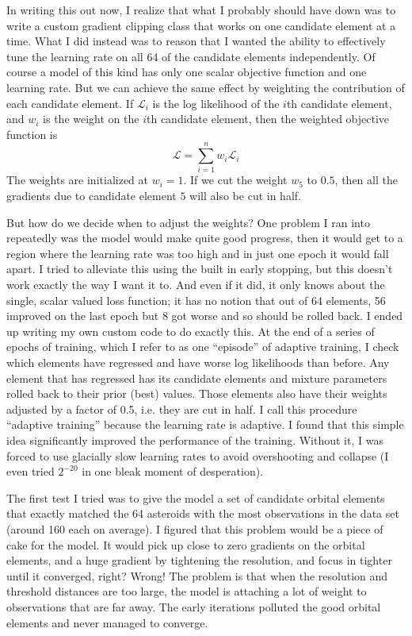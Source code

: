 In writing this out now, I realize that what I probably should have down was to write a custom gradient clipping class that works on one candidate element at a time.
What I did instead was to reason that I wanted the ability to effectively tune the learning rate on all 64 of the candidate elements independently.
Of course a model of this kind has only one scalar objective function and one learning rate.
But we can achieve the same effect by weighting the contribution of each candidate element.
If $\mathcal{L}_i$ is the log likelihood of the $i$th candidate element, and $w_i$ is the weight on the $i$th candidate element,  
then the weighted objective function is 
$$\mathcal{L} = \sum_{i=1}^{n} w_i \mathcal{L}_i$$
The weights are initialized at $w_i=1$.  If we cut the weight $w_5$ to $0.5$, then all the gradients due to candidate element $5$ will also be cut in half.

But how do we decide when to adjust the weights?
One problem I ran into repeatedly was the model would make quite good progress, 
then it would get to a region where the learning rate was too high and in just one epoch it would fall apart.
I tried to alleviate this using the built in early stopping, but this doesn't work exactly the way I want it to.
And even if it did, it only knows about the single, scalar valued loss function;
it has no notion that out of 64 elements, 56 improved on the last epoch but 8 got worse and so should be rolled back.
I ended up writing my own custom code to do exactly this.
At the end of a series of epochs of training, which I refer to as one ``episode'' of adaptive training,
I check which elements have regressed and have worse log likelihoods than before.
Any element that has regressed has its candidate elements and mixture parameters rolled back to their prior (best) values.
Those elements also have their weights adjusted by a factor of 0.5, i.e. they are cut in half.
I call this procedure ``adaptive training'' because the learning rate is adaptive.
I found that this simple idea significantly improved the performance of the training.
Without it, I was forced to use glacially slow learning rates to avoid overshooting and collapse (I even tried $2^{-20}$ in one bleak moment of desperation).

The first test I tried was to give the model a set of candidate orbital elements that exactly 
matched the 64 asteroids with the most observations in the data set (around 160 each on average).
I figured that this problem would be a piece of cake for the model.
It would pick up close to zero gradients on the orbital elements, and a huge gradient by tightening the resolution,
and focus in tighter until it converged, right?
Wrong! The problem is that when the resolution and threshold distances are too large, 
the model is attaching a lot of weight to observations that are far away.
The early iterations polluted the good orbital elements and never managed to converge.

